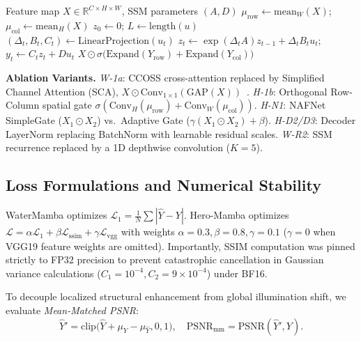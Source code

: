 \documentclass[conference]{IEEEtran}
\newcommand{\psnrmm}{\mathrm{PSNR}_{\mathrm{mm}}}
\begin{document}
	\begin{algorithm}[t]
		\caption{Regime~B: Orthogonal Pooled Spatial Scan}\label{alg:pool}
		\footnotesize
		\begin{algorithmic}[1]
			\Require Feature map $X\in\mathbb{R}^{C\times H\times W}$, SSM parameters $(A, D)$
			\State $\mu_{\text{row}} \gets \mathrm{mean}_W(X)$; \quad $\mu_{\text{col}} \gets \mathrm{mean}_H(X)$
			\State $z_0 \gets 0$; \quad $L \gets \mathrm{length}(u)$
			\State $(\Delta_t, B_t, C_t) \gets \mathrm{LinearProjection}(u_t)$
			\State $z_t \gets \exp(\Delta_t A) z_{t-1} + \Delta_t B_t u_t$; \quad $y_t \gets C_t z_t + D u_t$
			\EndFor
			\EndFor
			\State \Return $X \odot \sigma\bigl(\mathrm{Expand}(Y_{\text{row}}) + \mathrm{Expand}(Y_{\text{col}})\bigr)$
		\end{algorithmic}
	\end{algorithm}
	
	\textbf{Ablation Variants.} \emph{W-1a}: CCOSS cross-attention replaced by Simplified Channel Attention (SCA), $X \odot \mathrm{Conv}_{1\times1}(\mathrm{GAP}(X))$~\cite{nafnet}. \emph{H-1b}: Orthogonal Row-Column spatial gate $\sigma(\mathrm{Conv}_H(\mu_{\text{row}}) + \mathrm{Conv}_W(\mu_{\text{col}}))$. \emph{H-N1}: NAFNet SimpleGate ($X_1 \odot X_2$) vs.\ Adaptive Gate ($\gamma(X_1 \odot X_2) + \beta$). \emph{H-D2/D3}: Decoder LayerNorm replacing BatchNorm with learnable residual scales. \emph{W-R2}: SSM recurrence replaced by a 1D depthwise convolution ($K=5$).
	
	\subsection{Loss Formulations and Numerical Stability}
	WaterMamba optimizes $\mathcal{L}_1 = \frac{1}{N}\sum |\hat Y - Y|$. Hero-Mamba optimizes $\mathcal{L} = \alpha\mathcal{L}_1 + \beta\mathcal{L}_{\text{ssim}} + \gamma\mathcal{L}_{\text{vgg}}$ with weights $\alpha=0.3, \beta=0.8, \gamma=0.1$ ($\gamma=0$ when VGG19 feature weights are omitted). Importantly, SSIM computation was pinned strictly to FP32 precision to prevent catastrophic cancellation in Gaussian variance calculations ($C_1=10^{-4}, C_2=9\times10^{-4}$) under BF16.
	
	To decouple localized structural enhancement from global illumination shift, we evaluate \emph{Mean-Matched PSNR}:
	\begin{equation}
		\hat Y' = \mathrm{clip}\bigl(\hat Y + \mu_Y - \mu_{\hat Y}, 0, 1\bigr), \quad \psnrmm = \mathrm{PSNR}(\hat Y', Y).
	\end{equation}
\end{document}
